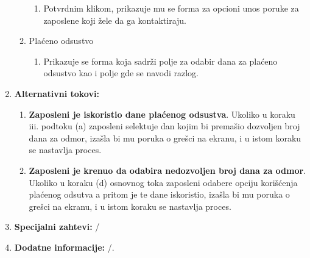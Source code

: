 \documentclass[a4paper]{article}
\begin{document}
\begin{enumerate}
\begin{enumerate}
\begin{enumerate}
                \item Potvrdnim klikom, prikazuje mu se forma za opcioni unos poruke za zaposlene koji žele da ga kontaktiraju. 
            \end{enumerate}
            \item Plaćeno odsustvo
            \begin{enumerate}
                \item Prikazuje se forma koja sadrži polje za odabir dana za plaćeno odsustvo kao i polje gde se navodi razlog.
            \end{enumerate}  
    \end{enumerate}
    \item \textbf{Alternativni tokovi:}
        \begin{enumerate}
            \item \textbf{Zaposleni je iskoristio dane plaćenog odsustva}. Ukoliko u koraku iii. podtoku (a) zaposleni selektuje dan kojim bi premašio dozvoljen broj dana za odmor, izašla bi mu poruka o grešci na ekranu, i u istom koraku se nastavlja proces.
            \item \textbf{Zaposleni je krenuo da odabira nedozvoljen broj dana za odmor}. Ukoliko u koraku (d) osnovnog toka zaposleni odabere opciju korišćenja plaćenog odsutva a pritom je te dane iskoristio, izašla bi mu poruka o grešci na ekranu, i u istom koraku se nastavlja proces.
        \end{enumerate}
    \item \textbf{Specijalni zahtevi:} /
    \item \textbf{Dodatne informacije:} /.
\end{enumerate}
\end{document}
